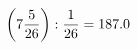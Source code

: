 \documentclass[preview]{standalone}
\begin{document}
\begin{align*}
\left( 7 { 5 \over 26 } \right)  :  { 1 \over 26 } = 187.0
\end{align*}
\end{document}
